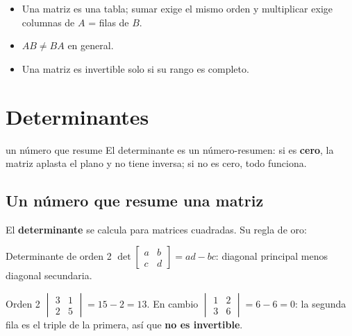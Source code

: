 \begin{tmresumen}
\begin{itemize}
\item Una matriz es una tabla; sumar exige el mismo orden y multiplicar exige columnas de $A$ = filas de $B$.
\item $AB\neq BA$ en general.
\item Una matriz es invertible solo si su rango es completo.
\end{itemize}
\end{tmresumen}

\section{Determinantes}
\label{sec:3-4}

\begin{tmconcepto}{un n\'umero que resume}
El determinante es un n\'umero-resumen: si es \textbf{cero}, la matriz aplasta el plano y no tiene inversa; si no es cero, todo funciona.
\end{tmconcepto}


\subsection{Un n\'umero que resume una matriz}
El \textbf{determinante} se calcula para matrices cuadradas. Su regla de oro:

\begin{tmdef}{Determinante de orden 2}
$\det\begin{bmatrix}a&b\\c&d\end{bmatrix}=ad-bc$: diagonal principal menos diagonal secundaria.
\end{tmdef}

\begin{tmejemplo}{Orden 2}
$\begin{vmatrix}3&1\\2&5\end{vmatrix}=15-2=13$. En cambio $\begin{vmatrix}1&2\\3&6\end{vmatrix}=6-6=0$: la segunda fila es el triple de la primera, as\'i que \textbf{no es invertible}.
\end{tmejemplo}

